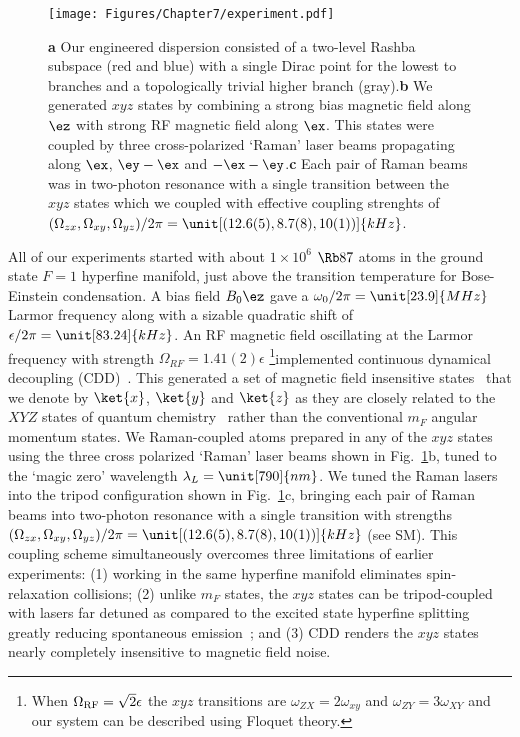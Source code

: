 \begin{figure}[htb]
\begin{center}
\texttt{[image: Figures/Chapter7/experiment.pdf]}
\caption{{\bfseries a} Our engineered dispersion consisted of a two-level Rashba subspace (red and blue) with a single Dirac point for the lowest to branches and a topologically trivial higher branch (gray).{\bfseries b} We generated $xyz$ states by combining a strong bias magnetic field along $\ez$ with strong RF magnetic field along $\ex$. This states were coupled by three cross-polarized `Raman' laser beams propagating along $\ex$, $\ey-\ex$ and $-\ex-\ey$.{\bfseries c} Each pair of Raman beams was in two-photon resonance with a single transition between the $xyz$ states which we coupled with effective coupling strenghts of $(\Omega_{zx}, \Omega_{xy}, \Omega_{yz})/2\pi=\unit[(12.6(5), 8.7(8), 10(1))]{kHz}$.}
\label{fig:Schematic}
\end{center}
\end{figure}

%
%
All of our experiments started with about $1\times 10^6$ $\Rb87$ atoms in the ground state $F=1$ hyperfine manifold, just above the transition temperature for Bose-Einstein condensation.  A bias field $B_0\ez$ gave a $\omega_0/2\pi=\unit[23.9]{MHz}$ Larmor frequency along with a sizable quadratic shift of $\epsilon/2\pi=\unit[83.24]{kHz}$. An RF magnetic field oscillating at the Larmor frequency with strength $\Omega_{RF}=1.41(2)\epsilon$ \footnote{When $\Omega_{\rm RF}=\sqrt{2}\epsilon$ the $xyz$ transitions are $\omega_{ZX}=2\omega_{xy}$ and $\omega_{ZY}=3\omega_{XY}$ and our system can be described using Floquet theory.}implemented continuous dynamical decoupling (CDD)~\cite{fonseca-romero_coherence_2005}.  This generated a set of magnetic field insensitive states~\cite{trypogeorgos_synthetic_2018, anderson_continuously_2018} that we denote by $\ket{x}$, $\ket{y}$ and $\ket{z}$ as they are closely related to the $XYZ$ states of quantum chemistry~\cite{cooper_reaching_2013} rather than the conventional $m_F$ angular momentum states. We Raman-coupled atoms prepared in any of the $xyz$ states using the three cross polarized `Raman' laser beams shown in Fig.~\ref{fig:Schematic}b, tuned to the `magic zero' wavelength $\lambda_L = \unit[790]{nm}$. We tuned the Raman lasers into the tripod configuration shown in Fig.~\ref{fig:Schematic}c, bringing each pair of Raman beams into two-photon resonance with a single transition with strengths $(\Omega_{zx}, \Omega_{xy}, \Omega_{yz})/2\pi=\unit[(12.6(5), 8.7(8), 10(1))]{kHz}$ (see SM). This coupling scheme simultaneously overcomes three limitations of earlier experiments: (1) working in the same hyperfine manifold eliminates spin-relaxation collisions; (2) unlike $m_F$ states, the $xyz$ states can be tripod-coupled with lasers far detuned as compared to the excited state hyperfine splitting greatly reducing spontaneous emission~\cite{cooper_reaching_2013}; and (3) CDD renders the $xyz$ states nearly completely insensitive to magnetic field noise.

